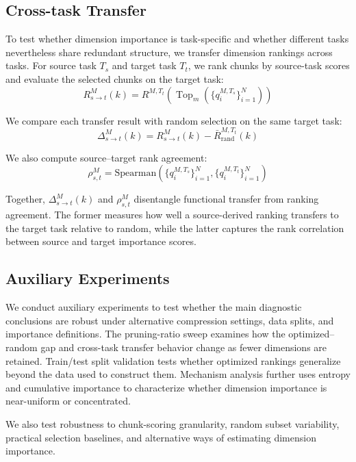 \documentclass[11pt]{article}
\begin{document}
\subsection{Cross-task Transfer}
To test whether dimension importance is task-specific and whether different tasks nevertheless share redundant structure, we transfer dimension rankings across tasks. For source task $T_s$ and target task $T_t$, we rank chunks by source-task scores and evaluate the selected chunks on the target task:
\begin{equation}
R_{s\rightarrow t}^{M}(k)=R^{M,T_t}\left(\operatorname{Top}_{m}\left(\{q_i^{M,T_s}\}_{i=1}^{N}\right)\right)
\end{equation}

We compare each transfer result with random selection on the same target task:
\begin{equation}
\Delta_{s\rightarrow t}^{M}(k)
=
R_{s\rightarrow t}^{M}(k)
-
\bar{R}_{\mathrm{rand}}^{M,T_t}(k)
\end{equation}

We also compute source--target rank agreement:
\begin{equation}
\rho_{s,t}^{M}=\mathrm{Spearman}\left(\{q_i^{M,T_s}\}_{i=1}^{N},\{q_i^{M,T_t}\}_{i=1}^{N}\right)
\end{equation}

Together, $\Delta_{s\rightarrow t}^{M}(k)$ and $\rho_{s,t}^{M}$ disentangle functional transfer from ranking agreement. The former measures how well a source-derived ranking transfers to the target task relative to random, while the latter captures the rank correlation between source and target importance scores.

\subsection{Auxiliary Experiments}
We conduct auxiliary experiments to test whether the main diagnostic conclusions are robust under alternative compression settings, data splits, and importance definitions. The pruning-ratio sweep examines how the optimized--random gap and cross-task transfer behavior change as fewer dimensions are retained. Train/test split validation tests whether optimized rankings generalize beyond the data used to construct them. Mechanism analysis further uses entropy and cumulative importance to characterize whether dimension importance is near-uniform or concentrated.

We also test robustness to chunk-scoring granularity, random subset variability, practical selection baselines, and alternative ways of estimating dimension importance. 
\end{document}
